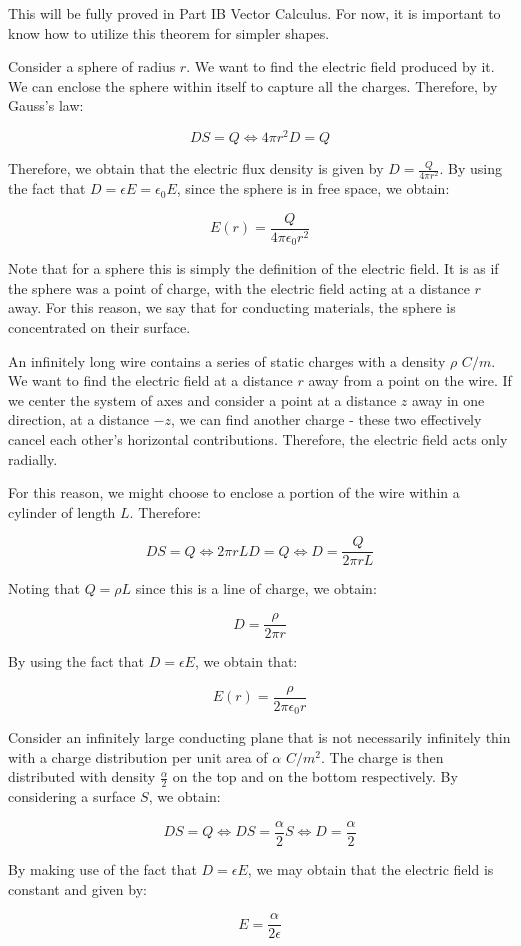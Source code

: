 \documentclass{article}
\begin{document}
This will be fully proved in Part IB Vector Calculus. For now, it is important to know how to utilize this theorem for simpler shapes.

\begin{example}[Sphere]
    Consider a sphere of radius $r$. We want to find the electric field produced by it. We can enclose the sphere within itself to capture all the charges. Therefore, by Gauss's law:

    \[ DS = Q \iff 4\pi r^2D = Q \]

    Therefore, we obtain that the electric flux density is given by $D = \frac{Q}{4\pi r^2}$. By using the fact that $D = \epsilon E = \epsilon_0 E$, since the sphere is in free space, we obtain:

    \[ E(r) = \frac{Q}{4\pi\epsilon_0 r^2} \]

    Note that for a sphere this is simply the definition of the electric field. It is as if the sphere was a point of charge, with the electric field acting at a distance $r$ away. For this reason, we say that for conducting materials, the sphere is concentrated on their surface.
\end{example}

\begin{example}
    An infinitely long wire contains a series of static charges with a density $\rho$ $C/m$. We want to find the electric field at a distance $r$ away from a point on the wire. If we center the system of axes and consider a point at a distance $z$ away in one direction, at a distance $-z$, we can find another charge - these two effectively cancel each other's horizontal contributions. Therefore, the electric field acts only radially. 

    For this reason, we might choose to enclose a portion of the wire within a cylinder of length $L$. Therefore:

    \[ DS = Q \iff 2\pi rLD = Q \iff D = \frac{Q}{2\pi rL} \]

    Noting that $Q = \rho L$ since this is a line of charge, we obtain:

    \[ D = \frac{\rho}{2\pi r} \]

    By using the fact that $D = \epsilon E$, we obtain that:

    \[ E(r) = \frac{\rho}{2\pi\epsilon_0 r} \]
\end{example}

\begin{example}
    Consider an infinitely large conducting plane that is not necessarily infinitely thin with a charge distribution per unit area of $\alpha$  $C/m^2$. The charge is then distributed with density $\frac{\alpha}{2}$ on the top and on the bottom respectively. By considering a surface $S$, we obtain:

    \[ DS = Q \iff DS = \frac{\alpha}{2}S \iff D = \frac{\alpha}{2} \]

    By making use of the fact that $D = \epsilon E$, we may obtain that the electric field is constant and given by:

    \[ E = \frac{\alpha}{2\epsilon} \]
\end{example}
\end{document}
